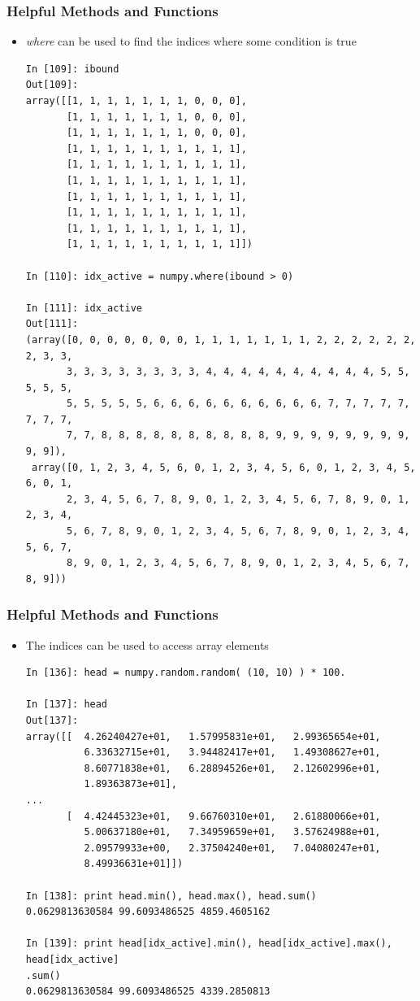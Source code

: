 \documentclass{beamer}
\begin{document}
\begin{frame}[fragile]
\frametitle{Helpful Methods and Functions}
  \begin{itemize}
    \item{\emph{where} can be used to find the indices where some condition is true}
    \begin{lstlisting}
In [109]: ibound
Out[109]:
array([[1, 1, 1, 1, 1, 1, 1, 0, 0, 0],
       [1, 1, 1, 1, 1, 1, 1, 0, 0, 0],
       [1, 1, 1, 1, 1, 1, 1, 0, 0, 0],
       [1, 1, 1, 1, 1, 1, 1, 1, 1, 1],
       [1, 1, 1, 1, 1, 1, 1, 1, 1, 1],
       [1, 1, 1, 1, 1, 1, 1, 1, 1, 1],
       [1, 1, 1, 1, 1, 1, 1, 1, 1, 1],
       [1, 1, 1, 1, 1, 1, 1, 1, 1, 1],
       [1, 1, 1, 1, 1, 1, 1, 1, 1, 1],
       [1, 1, 1, 1, 1, 1, 1, 1, 1, 1]])

In [110]: idx_active = numpy.where(ibound > 0)

In [111]: idx_active
Out[111]:
(array([0, 0, 0, 0, 0, 0, 0, 1, 1, 1, 1, 1, 1, 1, 2, 2, 2, 2, 2, 2, 2, 3, 3,
       3, 3, 3, 3, 3, 3, 3, 3, 4, 4, 4, 4, 4, 4, 4, 4, 4, 4, 5, 5, 5, 5, 5,
       5, 5, 5, 5, 5, 6, 6, 6, 6, 6, 6, 6, 6, 6, 6, 7, 7, 7, 7, 7, 7, 7, 7,
       7, 7, 8, 8, 8, 8, 8, 8, 8, 8, 8, 8, 9, 9, 9, 9, 9, 9, 9, 9, 9, 9]),
 array([0, 1, 2, 3, 4, 5, 6, 0, 1, 2, 3, 4, 5, 6, 0, 1, 2, 3, 4, 5, 6, 0, 1,
       2, 3, 4, 5, 6, 7, 8, 9, 0, 1, 2, 3, 4, 5, 6, 7, 8, 9, 0, 1, 2, 3, 4,
       5, 6, 7, 8, 9, 0, 1, 2, 3, 4, 5, 6, 7, 8, 9, 0, 1, 2, 3, 4, 5, 6, 7,
       8, 9, 0, 1, 2, 3, 4, 5, 6, 7, 8, 9, 0, 1, 2, 3, 4, 5, 6, 7, 8, 9]))
    \end{lstlisting}
  \end{itemize}
\end{frame}


\begin{frame}[fragile]
\frametitle{Helpful Methods and Functions}
  \begin{itemize}
    \item{The indices can be used to access array elements}
    \begin{lstlisting}
In [136]: head = numpy.random.random( (10, 10) ) * 100.

In [137]: head
Out[137]:
array([[  4.26240427e+01,   1.57995831e+01,   2.99365654e+01,
          6.33632715e+01,   3.94482417e+01,   1.49308627e+01,
          8.60771838e+01,   6.28894526e+01,   2.12602996e+01,
          1.89363873e+01],
...
       [  4.42445323e+01,   9.66760310e+01,   2.61880066e+01,
          5.00637180e+01,   7.34959659e+01,   3.57624988e+01,
          2.09579933e+00,   2.37504240e+01,   7.04080247e+01,
          8.49936631e+01]])

In [138]: print head.min(), head.max(), head.sum()
0.0629813630584 99.6093486525 4859.4605162

In [139]: print head[idx_active].min(), head[idx_active].max(), head[idx_active]
.sum()
0.0629813630584 99.6093486525 4339.2850813
    \end{lstlisting}
  \end{itemize}
\end{frame}
\end{document}
